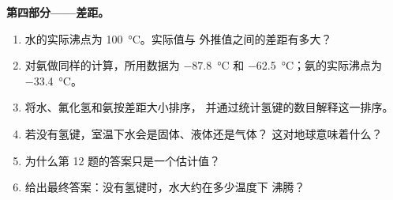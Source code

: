 \begin{problem}
\medskip
\noindent\textbf{第四部分——差距。}
\begin{enumerate}[resume]
  \item 水的实际沸点为 \qty{100}{\celsius}。实际值与
        外推值之间的差距有多大？
  \item 对氨做同样的计算，所用数据为  \qty{-87.8}{\celsius} 和
         \qty{-62.5}{\celsius}；氨的实际沸点为
        \qty{-33.4}{\celsius}。
  \item 将水、氟化氢和氨按差距大小排序，
        并通过统计氢键的数目解释这一排序。
  \item 若没有氢键，室温下水会是固体、液体还是气体？
        这对地球意味着什么？
  \item 为什么第 12 题的答案只是一个估计值？
  \item 给出最终答案：没有氢键时，水大约在多少温度下
        沸腾？
\end{enumerate}
\end{problem}
